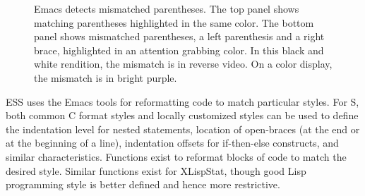 \documentclass{article}
\begin{document}
\begin{figure}[tbp]%
  \caption{Emacs detects mismatched parentheses.  The top panel
    shows matching parentheses highlighted in the same color.  The
    bottom panel shows mismatched parentheses, a left parenthesis and
    a right brace, highlighted in an attention grabbing color.  In
    this black and white rendition, the mismatch is in reverse video.
    On a color display, the mismatch is in bright purple.  }
  \label{fig:font}
\end{figure}

ESS uses the Emacs tools for reformatting code to match particular
styles.  For S, both common C format styles and locally customized
styles can be used to define the indentation level for nested
statements, location of open-braces (at the end or at the beginning of
a line), indentation offsets for if-then-else constructs, and similar
characteristics.  Functions exist to reformat blocks of code to match
the desired style.  Similar functions exist for XLispStat, though good
Lisp programming style is better defined and hence more restrictive.
\end{document}
